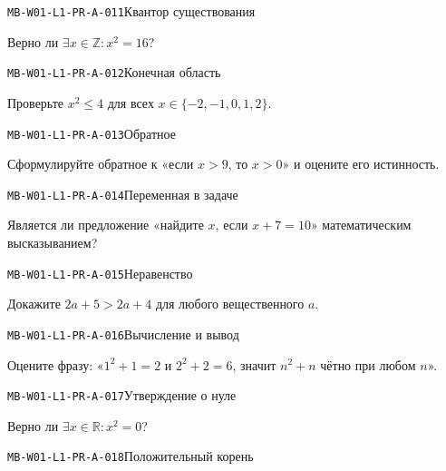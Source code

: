 \documentclass[11pt,a4paper,openany]{book}
\newcommand{\muid}[1]{\texttt{\footnotesize #1}}
\begin{document}
\noindent\hypertarget{MB-W01-L1-PR-A-011}{}\muid{MB-W01-L1-PR-A-011}\quad Квантор существования\par

Верно ли $\exists x\in\mathbb Z\colon x^2=16$?\par\medskip

\noindent\hypertarget{MB-W01-L1-PR-A-012}{}\muid{MB-W01-L1-PR-A-012}\quad Конечная область\par

Проверьте $x^2\le4$ для всех $x\in\{-2,-1,0,1,2\}$.\par\medskip

\noindent\hypertarget{MB-W01-L1-PR-A-013}{}\muid{MB-W01-L1-PR-A-013}\quad Обратное\par

Сформулируйте обратное к «если $x>9$, то $x>0$» и оцените его истинность.\par\medskip

\noindent\hypertarget{MB-W01-L1-PR-A-014}{}\muid{MB-W01-L1-PR-A-014}\quad Переменная в задаче\par

Является ли предложение «найдите $x$, если $x+7=10$» математическим высказыванием?\par\medskip

\noindent\hypertarget{MB-W01-L1-PR-A-015}{}\muid{MB-W01-L1-PR-A-015}\quad Неравенство\par

Докажите $2a+5>2a+4$ для любого вещественного $a$.\par\medskip

\noindent\hypertarget{MB-W01-L1-PR-A-016}{}\muid{MB-W01-L1-PR-A-016}\quad Вычисление и вывод\par

Оцените фразу: «$1^2+1=2$ и $2^2+2=6$, значит $n^2+n$ чётно при любом $n$».\par\medskip

\noindent\hypertarget{MB-W01-L1-PR-A-017}{}\muid{MB-W01-L1-PR-A-017}\quad Утверждение о нуле\par

Верно ли $\exists x\in\mathbb R\colon x^2=0$?\par\medskip

\noindent\hypertarget{MB-W01-L1-PR-A-018}{}\muid{MB-W01-L1-PR-A-018}\quad Положительный корень\par
\end{document}
